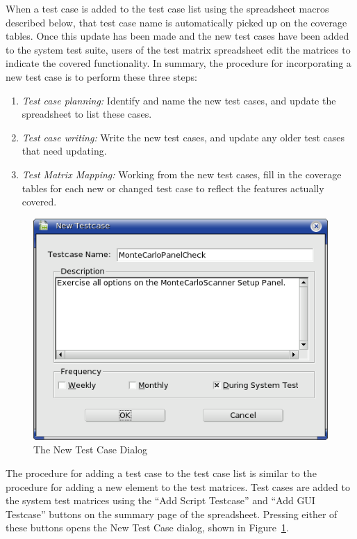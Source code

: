 When a test case is added to the test case list using the spreadsheet macros described below, that
test case name is automatically picked up on the coverage tables.  Once this update has been made
and the new test cases have been added to the system test suite, users of the test matrix
spreadsheet edit the matrices to indicate the covered functionality.  In summary, the procedure for
incorporating a new test case is to perform these three steps:

\begin{enumerate}
\item \emph{Test case planning:} Identify and name the new test cases, and update the spreadsheet to
list these cases.
\item \emph{Test case writing:}  Write the new test cases, and update any older test cases that need
updating.
\item \emph{Test Matrix Mapping:}  Working from the new test cases, fill in the coverage tables for
each new or changed test case to reflect the features actually covered.
\end{enumerate}

\begin{figure}[h!]
\begin{center}
\includegraphics[246,185]{Images/AddingAGuiCase.png}
\caption{\label{figure:AddATestCase}The New Test Case Dialog}
\end{center}
\end{figure}

The procedure for adding a test case to the test case list is similar to the procedure for adding a
new element to the test matrices.  Test cases are added to the system test matrices using the ``Add
Script Testcase'' and ``Add GUI Testcase'' buttons on the summary page of the spreadsheet.  Pressing
either of these buttons opens the New Test Case dialog, shown in Figure~\ref{figure:AddATestCase}.

